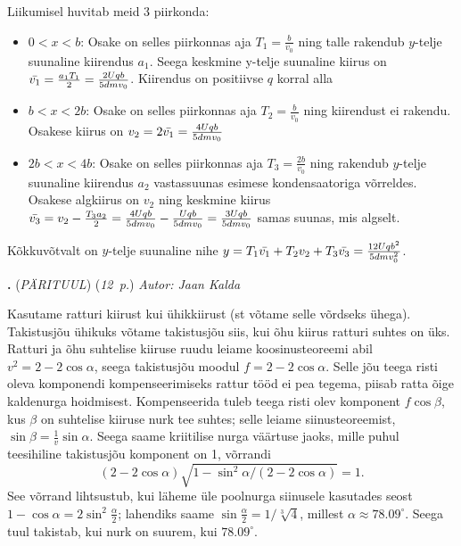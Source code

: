 \documentclass[11pt,a5paper]{article}
\newcommand{\numb}[1]{\vspace{5pt}\textbf{\large #1}}
\newcommand{\nimi}[1]{(\textsl{\small #1})}
\newcommand{\punktid}[1]{(\emph{#1~p.})}
\newcounter{ylesanne}
\newcommand{\yl}[1]{\addtocounter{ylesanne}{1}\numb{\theylesanne.} \nimi{#1} \newblock{}}
\newcommand{\autor}[1]{\emph{ Autor: #1}}%
\begin{document}
Liikumisel huvitab meid 3 piirkonda:
\begin{itemize}
    \item $0 < x < b$: Osake on selles piirkonnas aja $T_1 = \frac{b}{v_0}$ ning talle rakendub $y$-telje suunaline kiirendus $a_1$. Seega keskmine y-telje suunaline kiirus on $\Bar{v_1}=\frac{a_1T_1}{2} = \frac{2Uqb}{5dmv_0}$. Kiirendus on positiivse $q$ korral alla
    \item $b<x<2b$: Osake on selles piirkonnas aja $T_2=\frac{b}{v_0}$ ning kiirendust ei rakendu. Osakese kiirus on $v_2 = 2\Bar{v_1} = \frac{4Uqb}{5dmv_0}$
    \item $2b<x<4b$: Osake on selles piirkonnas aja $T_3 = \frac{2b}{v_0}$ ning rakendub $y$-telje suunaline kiirendus $a_2$ vastassuunas esimese kondensaatoriga võrreldes. Osakese algkiirus on $v_2$ ning keskmine kiirus $\Bar{v_3} = v_2 - \frac{T_3a_2}{2} = \frac{4Uqb}{5dmv_0} - \frac{Uqb}{5dmv_0} = \frac{3Uqb}{5dmv_0}$ samas suunas, mis algselt.
\end{itemize}

Kõkkuvõtvalt on $y$-telje suunaline nihe $y = T_1\Bar{v_1} + T_2v_2 + T_3\Bar{v_3} = \frac{12Uqb^2}{5dmv_0^2}$.




\yl{PÄRITUUL}
\punktid{12} \autor{Jaan Kalda}

Kasutame ratturi kiirust kui ühikkiirust (st võtame selle võrdseks ühega). Takistusjõu ühikuks võtame takistusjõu siis, kui õhu kiirus ratturi suhtes on üks. Ratturi ja õhu suhtelise kiiruse ruudu leiame koosinusteoreemi abil $v^2=2-2\cos\alpha$, seega takistusjõu moodul  $f=2-2\cos\alpha$. Selle jõu teega risti oleva komponendi kompenseerimiseks rattur tööd ei pea tegema, piisab ratta õige kaldenurga hoidmisest. Kompenseerida tuleb teega risti olev komponent $f\cos\beta$, kus $\beta$ on suhtelise kiiruse nurk tee suhtes; selle leiame siinusteoreemist, $\sin\beta=\frac 1v\sin\alpha$. Seega saame kriitilise nurga väärtuse jaoks, mille puhul teesihiline takistusjõu komponent on 1, võrrandi
$$(2-2\cos\alpha)\sqrt{1-\sin^2\alpha/(2-2\cos\alpha)}=1.$$
See võrrand lihtsustub, kui läheme üle poolnurga siinusele kasutades seost $1-\cos\alpha=2\sin^2\frac\alpha 2$; lahendiks saame  $\sin\frac\alpha 2= 1/\sqrt[3]4$, millest $\alpha\approx 78.09^\circ$. Seega tuul takistab, kui nurk on suurem, kui $78.09^\circ$.
\end{document}
